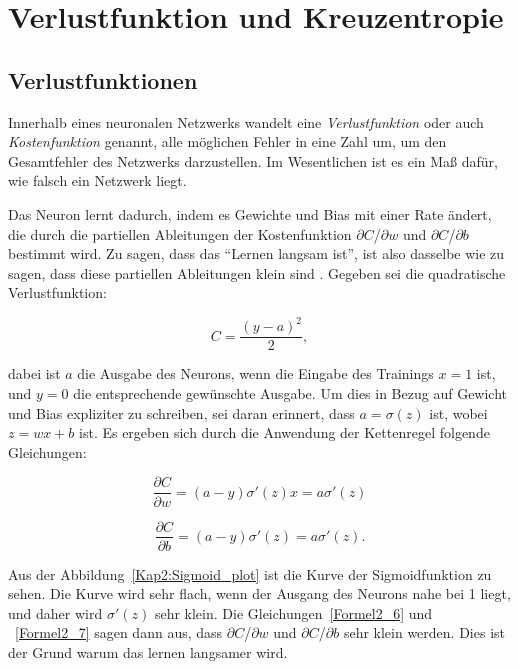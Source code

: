 \section{Verlustfunktion und Kreuzentropie}
\subsection{Verlustfunktionen}
Innerhalb eines neuronalen Netzwerks wandelt eine \textit{Verlustfunktion} oder auch \textit{Kostenfunktion} genannt, alle möglichen Fehler in eine Zahl um, um den Gesamtfehler des Netzwerks darzustellen. Im Wesentlichen ist es ein Maß dafür, wie falsch ein Netzwerk liegt.

Das Neuron lernt dadurch, indem es Gewichte und Bias mit einer Rate ändert, die durch die partiellen Ableitungen der Kostenfunktion $\partial$$C$/$\partial$$w$ und $\partial$$C$/$\partial$$b$ bestimmt wird. Zu sagen, dass das \enquote{Lernen langsam ist}, ist also dasselbe wie zu sagen, dass diese partiellen Ableitungen klein sind \cite*[61]{Nielsen2015}. Gegeben sei die quadratische Verlustfunktion:

\begin{equation} \label{Formel2_5}
    C=\frac{( y-a)^{2}}{2},
\end{equation}

dabei ist $a$ die Ausgabe des Neurons, wenn die Eingabe des Trainings $x = 1$ ist, und $y = 0$ die entsprechende gewünschte Ausgabe. Um dies in Bezug auf Gewicht und Bias expliziter zu schreiben, sei daran erinnert, dass $a = \sigma(z)$ ist, wobei $z = wx + b$ ist. Es ergeben sich durch die Anwendung der Kettenregel folgende Gleichungen:

\begin{equation} \label{Formel2_6}
    \frac{\partial C}{\partial w} =( a-y) \sigma '( z) x=a\sigma '( z)
\end{equation}

\begin{equation} \label{Formel2_7}
    \frac{\partial C}{\partial b} =( a-y) \sigma '( z) =a\sigma '( z).
\end{equation}
        
Aus der Abbildung~\ref{Kap2:Sigmoid_plot} ist die Kurve der Sigmoidfunktion zu sehen. Die Kurve wird sehr flach, wenn der Ausgang des Neurons nahe bei 1 liegt, und daher wird $\sigma'(z)$ sehr klein. Die Gleichungen~\ref{Formel2_6} und ~\ref{Formel2_7} sagen dann aus, dass $\partial$$C$/$\partial$$w$  und  $\partial$$C$/$\partial$$b$ sehr klein werden. Dies ist der Grund warum das lernen langsamer wird.

